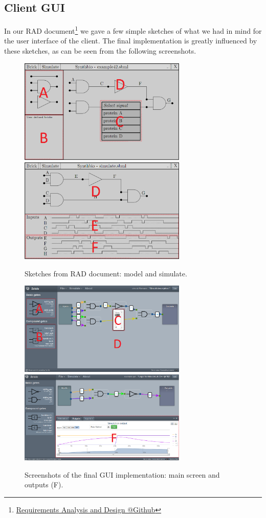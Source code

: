 \documentclass[a4paper]{article}
\makeatletter
\newcommand{\urlRAD}{https://github.com/FelixAkk/synthbio/raw/master/deliverables/rad/rad.pdf}
\newcommand{\hrefRAD}{\href{\urlRAD}{Requirements Analysis and Design @Github}}
\makeatother
\begin{document}
\subsection{Client GUI}
\label{process-gui}
In our RAD document\footnote{\hrefRAD} we gave a few simple sketches of what we had in mind for the user interface of the client. The final implementation is greatly influenced by these sketches, as can be seen from the following screenshots.\\

\begin{figure}[h!]
\includegraphics[width=8cm]{pictures/gui_sketch1_marks.png} 
\includegraphics[width=8cm]{pictures/gui_sketch2_marks.png}
\caption{Sketches from RAD document: model and simulate.}
\label{fig-gui-proposed}
\end{figure}

\begin{figure}[h!]
\includegraphics[width=8cm]{pictures/gui_final1_marks.png} 
\includegraphics[width=8cm]{pictures/gui_final2_marks.png}
\caption{Screenshots of the final GUI implementation: main screen and outputs (F).}
\label{fig-gui-implemented}
\end{figure}
\end{document}
